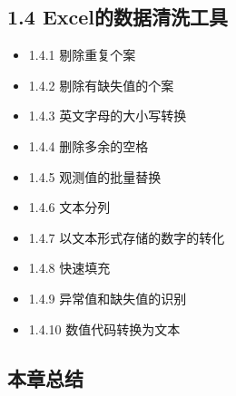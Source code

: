 \documentclass[
  letterpaper,
  DIV=11,
  numbers=noendperiod]{scrartcl}
\providecommand{\tightlist}{%
  \setlength{\itemsep}{0pt}\setlength{\parskip}{0pt}}\usepackage{longtable,booktabs,array}
\begin{document}
\subsection{1.4
Excel的数据清洗工具}\label{excelux7684ux6570ux636eux6e05ux6d17ux5de5ux5177}

\begin{itemize}
\tightlist
\item
  1.4.1 剔除重复个案
\item
  1.4.2 剔除有缺失值的个案
\item
  1.4.3 英文字母的大小写转换
\item
  1.4.4 删除多余的空格
\item
  1.4.5 观测值的批量替换
\item
  1.4.6 文本分列
\item
  1.4.7 以文本形式存储的数字的转化
\item
  1.4.8 快速填充
\item
  1.4.9 异常值和缺失值的识别
\item
  1.4.10 数值代码转换为文本
\end{itemize}

\subsection{本章总结}\label{ux672cux7ae0ux603bux7ed3}
\end{document}
